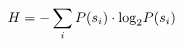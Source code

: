 \documentclass[preview]{standalone}
\begin{document}
\begin{align*}
\special{dvisvgm:raw <g id='unique000'>}H = -\sum_{i} P(s_i) \cdot \log_2\!P(s_i)\special{dvisvgm:raw </g>}
\end{align*}
\end{document}
